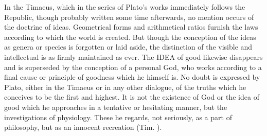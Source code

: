 \documentclass[11pt,letter]{article}
\begin{document}
\par  In the Timaeus, which in the series of Plato's works immediately follows the Republic, though probably written some time afterwards, no mention occurs of the doctrine of ideas. Geometrical forms and arithmetical ratios furnish the laws according to which the world is created. But though the conception of the ideas as genera or species is forgotten or laid aside, the distinction of the visible and intellectual is as firmly maintained as ever. The IDEA of good likewise disappears and is superseded by the conception of a personal God, who works according to a final cause or principle of goodness which he himself is. No doubt is expressed by Plato, either in the Timaeus or in any other dialogue, of the truths which he conceives to be the first and highest. It is not the existence of God or the idea of good which he approaches in a tentative or hesitating manner, but the investigations of physiology. These he regards, not seriously, as a part of philosophy, but as an innocent recreation (Tim. ).
\end{document}
